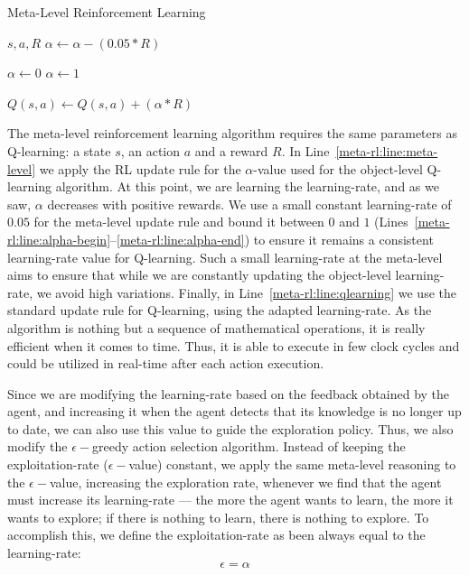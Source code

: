 \begin{algorithm}
	\caption{Meta-Level Reinforcement Learning}
	\label{alg:meta-rl} 
	\begin{algorithmic}[1]
		\REQUIRE $s, a, R$
		\STATE $\alpha \gets \alpha - (0.05 * R)$ \label{meta-rl:line:meta-level}
		\item[]
		 \label{meta-rl:line:alpha-begin}
			\STATE $\alpha \gets 0$
		\ENDIF
			\STATE $\alpha \gets 1$
		\ENDIF \label{meta-rl:line:alpha-end}
		\item[]
		\STATE $Q(s,a) \gets Q(s,a) + (\alpha * R)$ \label{meta-rl:line:qlearning}
	\end{algorithmic}
\end{algorithm}

The meta-level reinforcement learning algorithm requires the same parameters as Q-learning:
a state $s$, an action $a$ and a reward $R$.
In Line~\ref{meta-rl:line:meta-level} we apply the RL update rule for the $\alpha$-value used for the object-level Q-learning algorithm. 
At this point, we are learning the learning-rate, and as we saw, $\alpha$ decreases with positive rewards. 
We use a small constant learning-rate of $0.05$ for the meta-level update rule and bound it between $0$ and $1$ (Lines~\ref{meta-rl:line:alpha-begin}--\ref{meta-rl:line:alpha-end}) to ensure it remains a consistent learning-rate value for Q-learning. 
Such a small learning-rate at the meta-level aims to ensure that while we are constantly updating the object-level learning-rate, we avoid high variations. 
Finally, in Line~\ref{meta-rl:line:qlearning} we use the standard update rule for Q-learning,
using the adapted learning-rate. 
As the algorithm is nothing but a sequence of mathematical operations, it is really efficient when it comes to time. 
Thus, it is able to execute in few clock cycles and could be utilized in real-time after each action execution.

Since we are modifying the learning-rate based on the feedback obtained by the agent, and increasing it when the agent detects that its knowledge is no longer up to date, we can also use this value to guide the exploration policy. 
Thus, we also modify the $\epsilon-$greedy action selection algorithm.
Instead of keeping the exploitation-rate ($\epsilon-$value) constant, we apply the same meta-level reasoning to the $\epsilon-$value, increasing the exploration rate, whenever we find that the agent must increase its learning-rate ---  the more the agent wants to learn, the more it wants to explore;
if there is nothing to learn, there is nothing to explore.
To accomplish this, we define the exploitation-rate as been always equal to the learning-rate:
\[
	\epsilon = \alpha
\]



